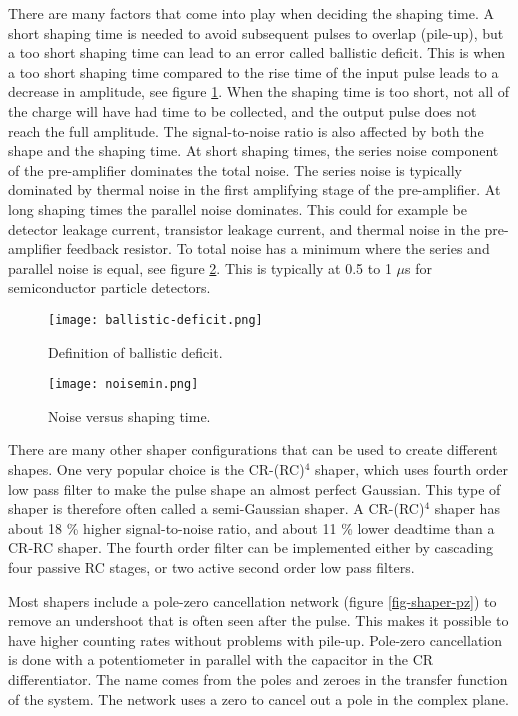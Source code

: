 \documentclass[../main/thesis.tex]{subfiles}
\begin{document}
There are many factors that come into play when deciding the shaping time. A short shaping time is needed to avoid subsequent pulses to overlap (pile-up), but a too short shaping time can lead to an error called ballistic deficit. This is when a too short shaping time compared to the rise time of the input pulse leads to a decrease in amplitude, see figure \ref{fig-ballistic-deficit}. When the shaping time is too short, not all of the charge will have had time to be collected, and the output pulse does not reach the full amplitude. The signal-to-noise ratio is also affected by both the shape and the shaping time. At short shaping times, the series noise component of the pre-amplifier dominates the total noise. The series noise is typically dominated by thermal noise in the first amplifying stage of the pre-amplifier. At long shaping times the parallel noise dominates. This could for example be detector leakage current, transistor leakage current, and thermal noise in the pre-amplifier feedback resistor. To total noise has a minimum where the series and parallel noise is equal, see figure \ref{fig-noise-min}. This is typically at 0.5 to 1 $\mu$s for semiconductor particle detectors. \citep{ORTEC}

\begin{figure}%
	\centering
	\texttt{[image: ballistic-deficit.png]}
	\caption{Definition of ballistic deficit. \citep{Knoll} }
	\label{fig-ballistic-deficit}
\end{figure}

\begin{figure}%
	\centering
	\texttt{[image: noisemin.png]}
	\caption{Noise versus shaping time. \citep{ORTEC} }
	\label{fig-noise-min}
\end{figure}

There are many other shaper configurations that can be used to create different shapes. One very popular choice is the CR-(RC)$^4$ shaper, which uses fourth order low pass filter to make the pulse shape an almost perfect Gaussian. This type of shaper is therefore often called a semi-Gaussian shaper. A CR-(RC)$^4$ shaper has about 18 \% higher signal-to-noise ratio, and about 11 \% lower deadtime than a CR-RC shaper. The fourth order filter can be implemented either by cascading four passive RC stages, or two active second order low pass filters. \citep{ORTEC} \citep[chap. 17]{Knoll}

Most shapers include a pole-zero cancellation network (figure \ref{fig-shaper-pz}) to remove an undershoot that is often seen after the pulse. This makes it possible to have higher counting rates without problems with pile-up. Pole-zero cancellation is done with a potentiometer in parallel with the capacitor in the CR differentiator. The name comes from the poles and zeroes in the transfer function of the system. The network uses a zero to cancel out a pole in the complex plane. \citep{ORTEC}
\end{document}
